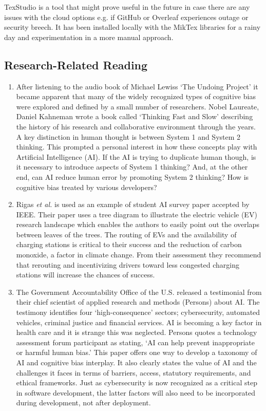 \documentclass[journal]{IEEEtran}
\begin{document}
TexStudio is a tool that might prove useful in the future in case there are any issues with the cloud options e.g. if GitHub or Overleaf experiences outage or security breech. It has been installed locally with the MikTex libraries for a rainy day and experimentation in a more manual approach.
\subsection{Research-Related Reading}
\begin{enumerate}
    \item After listening to the audio book of Michael Lewis\textquotesingle s \enquote*{The Undoing Project} it became apparent that many of the widely recognized types of cognitive bias were explored and defined by a small number of researchers. Nobel Laureate, Daniel Kahneman wrote a book called \enquote*{Thinking Fast and Slow} \cite{KahnemanTFS} describing the history of his research and collaborative environment through the years. A key distinction in human thought is between System 1 and System 2 thinking. This prompted a personal interest in how these concepts play with Artificial Intelligence (AI). If the AI is trying to duplicate human though, is it necessary to introduce aspects of System 1 thinking? And, at the other end, can AI reduce human error by promoting System 2 thinking? How is cognitive bias treated by various developers?
    \item Rigas \textit{et al.} \cite{Rigas} is used as an example of student AI survey paper accepted by IEEE. Their paper uses a tree diagram to illustrate the electric vehicle (EV) research landscape which enables the authors to easily point out the overlaps between leaves of the trees. The routing of EVs and the availability of charging stations is critical to their success and the reduction of carbon monoxide, a factor in climate change. From their assessment they recommend that rerouting and incentivizing drivers toward less congested charging stations will increase the chances of success.
    \item The Government Accountability Office of the U.S. released a testimonial from their chief scientist of applied research and methods (Persons) about AI. The testimony identifies four \enquote*{high-consequence} sectors; cybersecurity, automated vehicles, criminal justice and financial services. AI is becoming a key factor in health care and it is strange this was neglected. Persons quotes a technology assessment forum participant as stating, \enquote*{AI can help prevent inappropriate or harmful human bias.} \cite{GAO} This paper offers one way to develop a taxonomy of AI and cognitive bias interplay. It also clearly states the value of AI and the challenges it faces in terms of barriers, access, statutory requirements, and ethical frameworks. Just as cybersecurity is now recognized as a critical step in software development, the latter factors will also need to be incorporated during development, not after deployment.

\end{enumerate}
\end{document}

